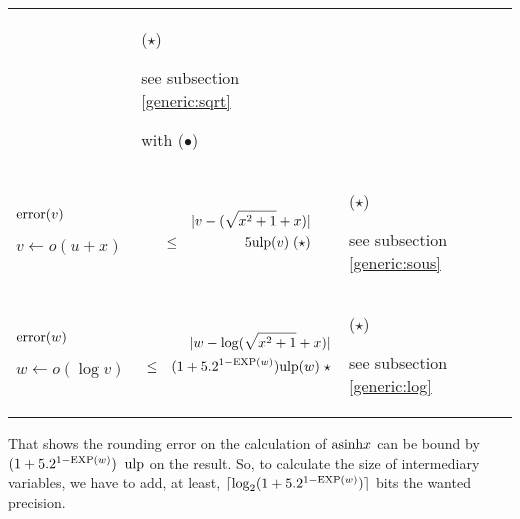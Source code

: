 \documentclass[12pt]{amsart}
\def\n{\textnormal}
\def\ulp{{\rm ulp}}
\def\Exp{{\rm EXP}}
\begin{document}
\begin{center}
\begin{tabular}{l l l}
\begin{minipage}{7.5cm}
\end{minipage} &
\begin{minipage}{6cm}

($\star$)

see subsection \ref{generic:sqrt}

with ($\bullet$)

\end{minipage}\\%
\begin{minipage}{2.5cm}
${\textnormal{error}}(v)$


$v \leftarrow o(u+x) $


\end{minipage} &
\begin{minipage}{7.5cm}

\begin{eqnarray}\nonumber
  &&|v-(\sqrt{x^2+1}+x)| \\\nonumber
  &       \leq& 5 \ulp(v) \;(\star)
\end{eqnarray}


\end{minipage} &
\begin{minipage}{6cm}

($\star$)

see subsection \ref{generic:sous}

\end{minipage}\\%
\begin{minipage}{2.5cm}
${\textnormal{error}}(w)$


$w \leftarrow o(\log v) $
\end{minipage} &
\begin{minipage}{7.5cm}

\begin{eqnarray}\nonumber
  &&|w-\log(\sqrt{x^2+1}+x)| \\\nonumber
  &       \leq& (1+5.2^{1-\Exp(w)}) \ulp(w) \;\star
\end{eqnarray}


\end{minipage} &
\begin{minipage}{6cm}

($\star$)

see subsection \ref{generic:log}

\end{minipage}
\end{tabular}
\end{center}

That shows the rounding error on the calculation of $\n{asinh} x$ can
be bound by $ (1+5.2^{1-\Exp(w)})\;\; \ulp$ on the result. So, to
calculate the size of intermediary variables, we have to add, at
least, $\lceil \log_2 (1+5.2^{1-\Exp(w)}) \rceil$ bits the wanted
precision.
 
\end{document}
